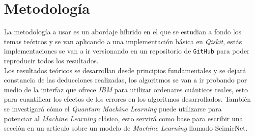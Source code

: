 \documentclass[a4paper]{article}
\begin{document}
\section{Metodología}
La metodología a usar es un abordaje híbrido en el que se estudian a fondo los temas teóricos y se van aplicando a una implementación básica en \textit{Qiskit}, estás implementaciones se van a ir versionando en un repositorio de \texttt{GitHub} para poder reproducir todos los resultados.\\

Los resultados teóricos se desarrollan desde principios fundamentales y se dejará constancia de las deducciones realizadas, los algoritmos se van a ir probando por medio de la interfaz que ofrece \textit{IBM} para utilizar ordenares cuánticos reales, esto para cuantificar los efectos de los errores en los algoritmos desarrollados. También se investigará cómo el \textit{Quantum Machine Learning} puede utilizarse para potenciar al \textit{Machine Learning} clásico, esto servirá como base para escribir una sección en un artículo sobre un modelo de \textit{Machine Learning} llamado SeimicNet.
\end{document}
